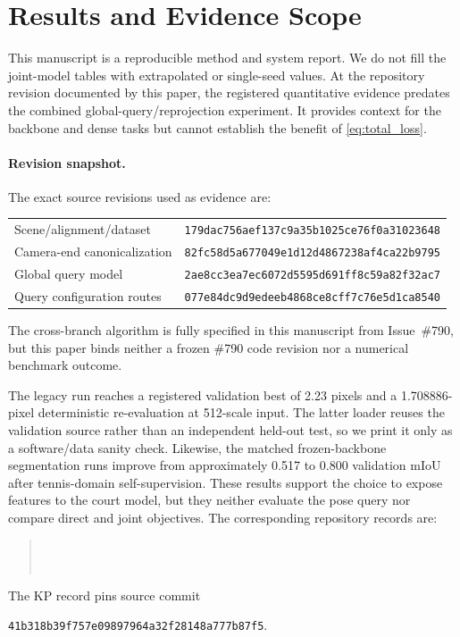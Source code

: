 \section{Results and Evidence Scope}
\label{sec:results}

This manuscript is a reproducible method and system report.  We do not fill the
joint-model tables with extrapolated or single-seed values.  At the repository
revision documented by this paper, the registered quantitative evidence
predates the combined global-query/reprojection experiment.  It provides
context for the backbone and dense tasks but cannot establish the benefit of
\cref{eq:total_loss}.

\paragraph{Revision snapshot.}
The exact source revisions used as evidence are:
\begin{center}
\small
\begin{tabular}{@{}ll@{}}
Scene/alignment/dataset & \texttt{179dac756aef137c9a35b1025ce76f0a31023648} \\
Camera-end canonicalization & \texttt{82fc58d5a677049e1d12d4867238af4ca22b9795} \\
Global query model & \texttt{2ae8cc3ea7ec6072d5595d691ff8c59a82f32ac7} \\
Query configuration routes & \texttt{077e84dc9d9edeeb4868ce8cff7c76e5d1ca8540} \\
\end{tabular}
\end{center}
The cross-branch algorithm is fully specified in this manuscript from
Issue~\#790, but this paper binds neither a frozen \#790 code revision nor a
numerical benchmark outcome.



The legacy \KP run reaches a registered validation best of 2.23 pixels and a
1.708886-pixel deterministic re-evaluation at 512-scale input.  The latter
loader reuses the validation source rather than an independent held-out test,
so we print it only as a software/data sanity check.  Likewise, the matched
frozen-backbone segmentation runs improve from approximately 0.517 to 0.800
validation mIoU after tennis-domain self-supervision.  These results support
the choice to expose \DINO{} features to the court model, but they neither
evaluate the pose query nor compare direct and joint objectives.
The corresponding repository records are:
\begin{quote}\small
{}\\
\\
\end{quote}
The KP record pins source commit
\begin{center}\texttt{41b318b39f757e09897964a32f28148a777b87f5}.\end{center}


